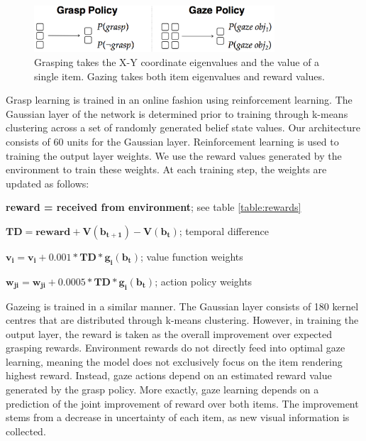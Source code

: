 \documentclass[11]{article}
\begin{document}
\begin{figure}[!h]
	\centering
	\includegraphics[width=0.8\textwidth]{figures/inputoutput.png}
	\caption{Grasping takes the X-Y coordinate eigenvalues and the value of a single item. Gazing takes both item eigenvalues and reward values.}
	\label{fig:inout}
\end{figure}

Grasp learning is trained in an online fashion using reinforcement learning.
The Gaussian layer of the network is determined prior to training through k-means clustering across a set of randomly generated belief state values.
Our architecture consists of 60 units for the Gaussian layer. 
Reinforcement learning is used to training the output layer weights.
We use the reward values generated by the environment to train these weights. 
At each training step, the weights are updated as follows:

\begin{list}{}{}
  \item \textbf{reward = received from environment}; see table \ref{table:rewards}
  \item $\pmb{TD = reward + V(b_{t+1}) - V(b_t)}$; temporal difference
  \item $\pmb{v_i = v_i + 0.001 * TD * g_i(b_t)}$; value function weights
  \item $\pmb{w_{ji} = w_{ji}+ 0.0005 * TD * g_i(b_t)}$; action policy weights
\end{list}  

Gazeing is trained in a similar manner. 
The Gaussian layer consists of 180 kernel centres that are distributed through k-means clustering. 
However, in training the output layer, the reward is taken as the overall improvement over expected grasping rewards. 
Environment rewards do not directly feed into optimal gaze learning, meaning the model does not exclusively focus on the item rendering highest reward.
Instead, gaze actions depend on an estimated reward value generated by the grasp policy.
More exactly, gaze learning depends on a prediction of the joint improvement of reward over both items.
The improvement stems from a decrease in uncertainty of each item, as new visual information is collected. 
\end{document}
